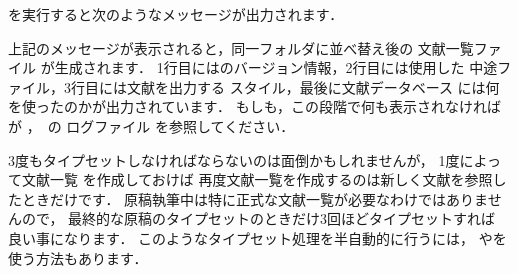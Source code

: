 
\JBibTeX を実行すると次のようなメッセージが出力されます．


%
上記のメッセージが表示されると，同一フォルダに並べ替え後の
文献一覧ファイル が生成されます．
1行目には{\JBibTeX}のバージョン情報，2行目には使用した
中途ファイル，3行目には文献を出力する
スタイル，最後に文献データベース 
には何を使ったのかが出力されています．
もしも，この段階で何も表示されなければ\JBibTeX が
，\JBibTeX\ の
ログファイル を参照してください．

3度もタイプセットしなければならないのは面倒かもしれませんが，
1度{\JBibTeX}によって文献一覧 を作成しておけば
再度文献一覧を作成するのは新しく文献を参照したときだけです．
原稿執筆中は特に正式な文献一覧が必要なわけではありませんので，
最終的な原稿のタイプセットのときだけ3回ほどタイプセットすれば
良い事になります．
このようなタイプセット処理を半自動的に行うには，
やを使う方法もあります．



